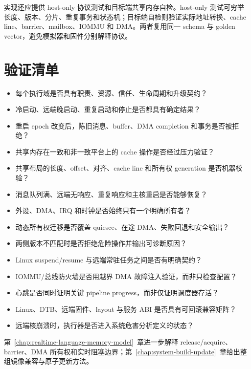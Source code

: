 实现还应提供 host-only 协议测试和目标端共享内存自检。host-only 测试可穷举长度、版本、分片、重复事务和状态机；目标端自检则验证实际地址转换、cache line、barrier、mailbox、IOMMU 和 DMA。两者复用同一 schema 与 golden vector，避免模拟器和固件分别解释协议。

\section{验证清单}

\begin{itemize}
  \item 每个执行域是否具有职责、资源、信任、生命周期和升级契约？
  \item 冷启动、远端晚启动、重复启动和停止是否都具有确定结果？
  \item 重启 epoch 改变后，陈旧消息、buffer、DMA completion 和事务是否被拒绝？
  \item 共享内存在一致和非一致平台上的 cache 操作是否经过压力验证？
  \item 共享布局的长度、offset、对齐、cache line 和所有权 generation 是否机器校验？
  \item 消息队列满、远端无响应、重复响应和主核重启是否能够恢复？
  \item 外设、DMA、IRQ 和时钟是否始终只有一个明确所有者？
  \item 动态所有权迁移是否覆盖 quiesce、在途 DMA、失败回退和安全输出？
  \item 两侧版本不匹配时是否拒绝危险操作并输出可诊断原因？
  \item Linux suspend/resume 与远端常驻任务之间是否有明确契约？
  \item IOMMU/总线防火墙是否用越界 DMA 故障注入验证，而非只检查配置？
  \item 心跳是否同时证明关键 pipeline progress，而非仅证明调度器存活？
  \item Linux、DTB、远端固件、layout 与服务 ABI 是否具有可回滚兼容矩阵？
  \item 远端核崩溃时，执行器是否进入系统危害分析定义的状态？
\end{itemize}

第~\ref{chap:realtime-language-memory-model}~章进一步解释 release/acquire、barrier、DMA 所有权和实时阻塞边界；第~\ref{chap:system-build-update}~章给出整组镜像兼容与原子更新方法。
